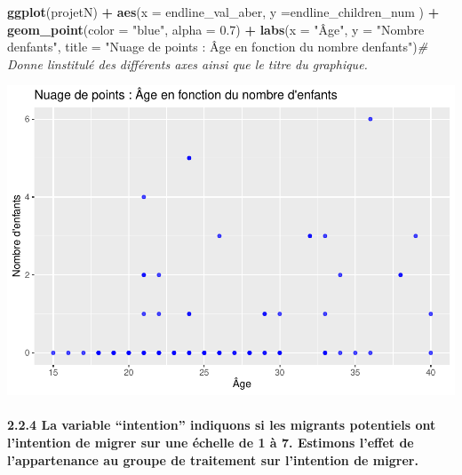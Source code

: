 \documentclass[
]{article}
\newenvironment{Shaded}{\begin{snugshade}}{\end{snugshade}}
\newcommand{\AttributeTok}[1]{\textcolor[rgb]{0.13,0.29,0.53}{#1}}
\newcommand{\CommentTok}[1]{\textcolor[rgb]{0.56,0.35,0.01}{\textit{#1}}}
\newcommand{\FloatTok}[1]{\textcolor[rgb]{0.00,0.00,0.81}{#1}}
\newcommand{\FunctionTok}[1]{\textcolor[rgb]{0.13,0.29,0.53}{\textbf{#1}}}
\newcommand{\NormalTok}[1]{#1}
\newcommand{\SpecialCharTok}[1]{\textcolor[rgb]{0.81,0.36,0.00}{\textbf{#1}}}
\newcommand{\StringTok}[1]{\textcolor[rgb]{0.31,0.60,0.02}{#1}}
\begin{document}
\begin{Shaded}
\begin{Highlighting}[]
\FunctionTok{ggplot}\NormalTok{(projetN) }\SpecialCharTok{+}
  \FunctionTok{aes}\NormalTok{(}\AttributeTok{x =}\NormalTok{ endline\_val\_aber, }\AttributeTok{y =}\NormalTok{endline\_children\_num ) }\SpecialCharTok{+}
  \FunctionTok{geom\_point}\NormalTok{(}\AttributeTok{color =} \StringTok{"blue"}\NormalTok{, }\AttributeTok{alpha =} \FloatTok{0.7}\NormalTok{) }\SpecialCharTok{+}
  \FunctionTok{labs}\NormalTok{(}\AttributeTok{x =} \StringTok{"Âge"}\NormalTok{, }\AttributeTok{y =} \StringTok{"Nombre d\textquotesingle{}enfants"}\NormalTok{, }\AttributeTok{title =} \StringTok{"Nuage de points : Âge en fonction du nombre d\textquotesingle{}enfants"}\NormalTok{)}\CommentTok{\# Donne l\textquotesingle{}institulé des différents axes ainsi que le titre du graphique.}
\end{Highlighting}
\end{Shaded}

\includegraphics{TP-R-ESSAI_files/figure-latex/unnamed-chunk-22-1.pdf}

\hypertarget{la-variable-intention-indiquons-si-les-migrants-potentiels-ont-lintention-de-migrer-sur-une-uxe9chelle-de-1-uxe0-7.-estimons-leffet-de-lappartenance-au-groupe-de-traitement-sur-lintention-de-migrer.}{%
\paragraph{2.2.4 La variable ``intention'' indiquons si les migrants
potentiels ont l'intention de migrer sur une échelle de 1 à 7. Estimons
l'effet de l'appartenance au groupe de traitement sur l'intention de
migrer.}\label{la-variable-intention-indiquons-si-les-migrants-potentiels-ont-lintention-de-migrer-sur-une-uxe9chelle-de-1-uxe0-7.-estimons-leffet-de-lappartenance-au-groupe-de-traitement-sur-lintention-de-migrer.}}
\end{document}
